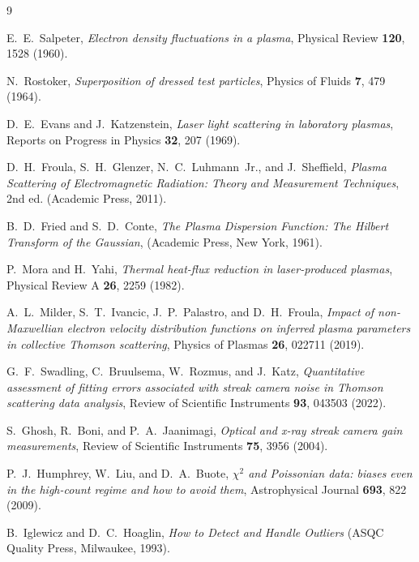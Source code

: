 \documentclass[11pt]{article}
\begin{document}
\begin{thebibliography}{9}

E.~E.~Salpeter,
\textit{Electron density fluctuations in a plasma},
Physical Review \textbf{120}, 1528 (1960).

N.~Rostoker,
\textit{Superposition of dressed test particles},
Physics of Fluids \textbf{7}, 479 (1964).

D.~E.~Evans and J.~Katzenstein,
\textit{Laser light scattering in laboratory plasmas},
Reports on Progress in Physics \textbf{32}, 207 (1969).

D.~H.~Froula, S.~H.~Glenzer, N.~C.~Luhmann~Jr., and J.~Sheffield,
\textit{Plasma Scattering of Electromagnetic Radiation: Theory and Measurement Techniques},
2nd ed. (Academic Press, 2011).

B.~D.~Fried and S.~D.~Conte,
\textit{The Plasma Dispersion Function: The Hilbert Transform of the Gaussian},
(Academic Press, New York, 1961).

P.~Mora and H.~Yahi,
\textit{Thermal heat-flux reduction in laser-produced plasmas},
Physical Review A \textbf{26}, 2259 (1982).

A.~L.~Milder, S.~T.~Ivancic, J.~P.~Palastro, and D.~H.~Froula,
\textit{Impact of non-Maxwellian electron velocity distribution functions on inferred
plasma parameters in collective Thomson scattering},
Physics of Plasmas \textbf{26}, 022711 (2019).

G.~F.~Swadling, C.~Bruulsema, W.~Rozmus, and J.~Katz,
\textit{Quantitative assessment of fitting errors associated with streak camera noise in
Thomson scattering data analysis},
Review of Scientific Instruments \textbf{93}, 043503 (2022).

S.~Ghosh, R.~Boni, and P.~A.~Jaanimagi,
\textit{Optical and x-ray streak camera gain measurements},
Review of Scientific Instruments \textbf{75}, 3956 (2004).

P.~J.~Humphrey, W.~Liu, and D.~A.~Buote,
\textit{$\chi^2$ and Poissonian data: biases even in the high-count regime and how to avoid them},
Astrophysical Journal \textbf{693}, 822 (2009).

B.~Iglewicz and D.~C.~Hoaglin,
\textit{How to Detect and Handle Outliers}
(ASQC Quality Press, Milwaukee, 1993).


\end{thebibliography}
\end{document}
